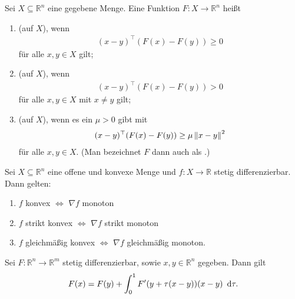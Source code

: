 \begin{definition}\label{def3.6}%
	Sei $X\subseteq\mathbb{R}^n$ eine gegebene Menge. Eine Funktion
	$F\colon X\to\mathbb{R}^n$ heißt
	\begin{enumerate}[label=(\alph*), leftmargin=*, nolistsep]
		\item {} (auf $X$), wenn
		\begin{align*}
		(x-y)^\top(F(x)-F(y))\geq 0
		\end{align*}
		für alle $x,y\in X$ gilt;
		\item {} (auf $X$), wenn
		\begin{align*}
		(x-y)^\top(F(x)-F(y))> 0
		\end{align*}
		für alle $x,y\in X$ mit $x\neq y$ gilt;
		\item {} (auf $X$), wenn es ein $\mu>0$ gibt
		mit
		\begin{align*}
		(x-y)^\top(F(x)-F(y))\geq \mu\left\lVert x-y \right\rVert^2
		\end{align*}
		für alle $x,y\in X$. (Man bezeichnet $F$ dann auch als
		.)
	\end{enumerate}
\end{definition}

\begin{satz}\label{3.7}%
	Sei $X\subseteq\mathbb{R}^n$ eine offene und konvexe Menge und
	$f\colon X\to\mathbb{R}$ stetig differenzierbar. Dann gelten:
	\begin{enumerate}[label=(\alph*), leftmargin=*, nolistsep]
		\item $f$ konvex $\Longleftrightarrow$ $\nabla f$ monoton
		\item $f$ strikt konvex $\Longleftrightarrow$ $\nabla f$ strikt monoton
		\item $f$ gleichmäßig konvex $\Longleftrightarrow$ $\nabla f$
		gleichmäßig monoton.
	\end{enumerate}
\end{satz}

\begin{satz}\label{MWS_Intform}%
	Sei $F\colon\mathbb{R}^n\to\mathbb{R}^m$ stetig differenzierbar,
	sowie $x,y\in\mathbb{R}^n$ gegeben. Dann gilt
	\begin{align*}
		F(x) = F(y) + \int_0^1 F'(y+\tau(x-y))(x-y)\enskip \mathrm{d}\tau.
	\end{align*}
\end{satz}

